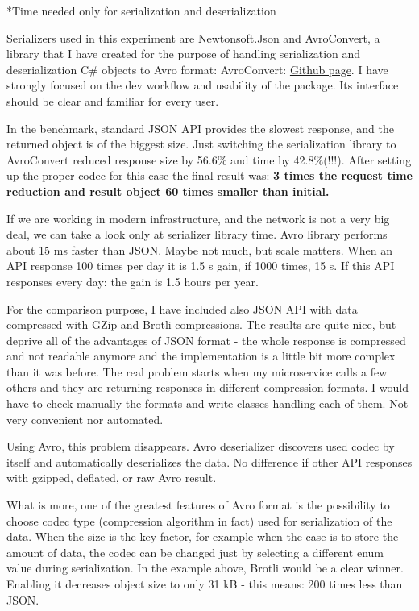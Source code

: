 \documentclass[]{article}
\begin{document}
*Time needed only for serialization and deserialization


Serializers used in this experiment are Newtonsoft.Json and AvroConvert, a library that I have created for the purpose of handling serialization and deserialization C\# objects to Avro format: AvroConvert: 
\href{https://github.com/AdrianStrugala/AvroConvert}{Github page}.
I have strongly focused on the dev workflow and usability of the package. Its interface should be clear and familiar for every user.   

In the benchmark, standard JSON API provides the slowest response, and the returned object is of the biggest size. Just switching the serialization library to AvroConvert reduced response size by 56.6\% and time by 42.8\%(!!!). After setting up the proper codec for this case the final result was: \textbf{3 times the request time reduction and result object 60 times smaller than initial.} 

If we are working in modern infrastructure, and the network is not a very big deal, we can take a look only at serializer library time. Avro library performs about 15 ms faster than JSON. Maybe not much, but scale matters. When an API response 100 times per day it is 1.5 s gain, if 1000 times, 15 s. If this API responses every day: the gain is 1.5 hours per year.

For the comparison purpose, I have included also JSON API with data compressed with GZip and Brotli compressions. The results are quite nice, but deprive all of the advantages of JSON format - the whole response is compressed and not readable anymore and the implementation is a little bit more complex than it was before. The real problem starts when my microservice calls a few others and they are returning responses in different compression formats. I would have to check manually the formats and write classes handling each of them. Not very convenient nor automated.

Using Avro, this problem disappears. Avro deserializer discovers used codec by itself and automatically deserializes the data. No difference if other API responses with gzipped, deflated, or raw Avro result.  

What is more, one of the greatest features of Avro format is the possibility to choose codec type (compression algorithm in fact) used for serialization of the data. When the size is the key factor, for example when the case is to store the amount of data, the codec can be changed just by selecting a different enum value during serialization. In the example above, Brotli would be a clear winner. Enabling it decreases object size to only 31 kB - this means: 200 times less than JSON.
\end{document}
